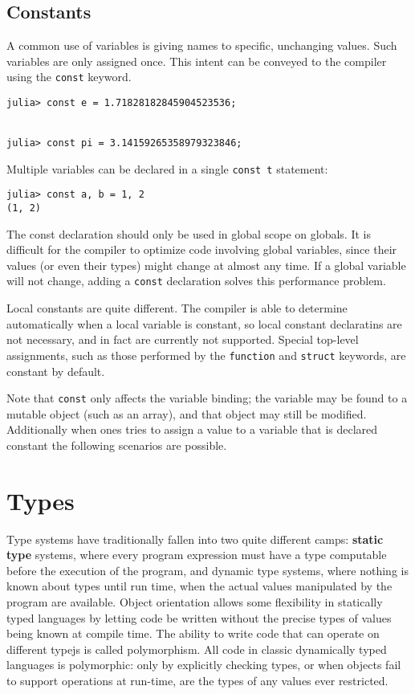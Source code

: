 \documentclass[
]{article}
\begin{document}
\hypertarget{constants}{%
\subsection{Constants}\label{constants}}

A common use of variables is giving names to specific, unchanging
values. Such variables are only assigned once. This intent can be
conveyed to the compiler using the \texttt{const} keyword.

\begin{verbatim}
julia> const e = 1.71828182845904523536;


julia> const pi = 3.14159265358979323846;
\end{verbatim}

Multiple variables can be declared in a single \texttt{const\ t}
statement:

\begin{verbatim}
julia> const a, b = 1, 2
(1, 2)
\end{verbatim}

The const declaration should only be used in global scope on globals. It
is difficult for the compiler to optimize code involving global
variables, since their values (or even their types) might change at
almost any time. If a global variable will not change, adding a
\texttt{const} declaration solves this performance problem.

Local constants are quite different. The compiler is able to determine
automatically when a local variable is constant, so local constant
declaratins are not necessary, and in fact are currently not supported.
Special top-level assignments, such as those performed by the
\texttt{function} and \texttt{struct} keywords, are constant by default.

Note that \texttt{const} only affects the variable binding; the variable
may be found to a mutable object (such as an array), and that object may
still be modified. Additionally when ones tries to assign a value to a
variable that is declared constant the following scenarios are possible.

\newpage

\hypertarget{types}{%
\section{Types}\label{types}}

Type systems have traditionally fallen into two quite different camps:
\textbf{static type} systems, where every program expression must have a
type computable before the execution of the program, and dynamic type
systems, where nothing is known about types until run time, when the
actual values manipulated by the program are available. Object
orientation allows some flexibility in statically typed languages by
letting code be written without the precise types of values being known
at compile time. The ability to write code that can operate on different
typejs is called polymorphism. All code in classic dynamically typed
languages is polymorphic: only by explicitly checking types, or when
objects fail to support operations at run-time, are the types of any
values ever restricted.
\end{document}

